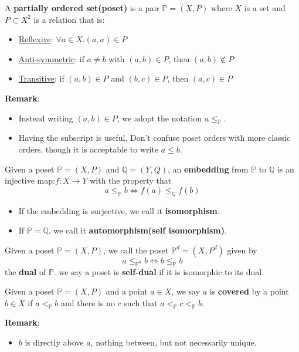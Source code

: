 \begin{definition}
    A \textbf{partially ordered set(poset)} is a pair $\mathbb{P}=(X,P)$ where $X$ is a set and $P \subset X^2$ is a relation that is:
    \begin{itemize}
        \item \underline{Reflexive}: $\forall a \in X. (a,a)\in P$
        \item \underline{Anti-symmetric}: if $a \neq b$ with $(a,b)\in P$, then $(a,b)\notin P$
        \item \underline{Transitive}: if $(a,b)\in P$ and $(b,c)\in P$, then $(a,c) \in P$
    \end{itemize}
\end{definition}
\textbf{Remark}:
\begin{itemize}
    \item Instead writing $(a,b)\in P$, we adopt the notation $a \leq_{\mathbb{P}}$.
    \item Having the subscript is useful. Don't confuse poset orders with more classic orders, though it is acceptable to write $a \leq b$.
\end{itemize}

\begin{definition}
    Given a poset $\mathbb{P}=(X,P)$ and $\mathbb{Q}=(Y,Q)$, an \textbf{embedding} from $\mathbb{P}$ to $\mathbb{Q}$ is an injective map:$f:X \longrightarrow Y$ with the property that $$a \leq_{\mathbb{P}} b \Longleftrightarrow f(a) \leq_{\mathbb{Q}} f(b)$$
    \begin{itemize}
        \item If the embedding is surjective, we call it \textbf{isomorphism}.
        \item If $\mathbb{P}=\mathbb{Q}$, we call it \textbf{automorphism(self isomorphism)}.
    \end{itemize}
\end{definition}

\begin{definition}
    Given a poset $\mathbb{P}=(X,P)$, we call the poset $\mathbb{P}^d=(X,P^d)$ given by $$a \leq_{\mathbb{P}^d} b \Longleftrightarrow b \leq_{\mathbb{P}} b$$
    the \textbf{dual} of $\mathbb{P}$. we say a poset is \textbf{self-dual} if it is isomorphic to its dual.
\end{definition}

\begin{definition}
    Given a poset $\mathbb{P}=(X,P)$ and a point $a \in X$, we say $a$ is \textbf{covered} by a point $b \in X$ if $a <_{\mathbb{P}} b$ and there is no $c$ such that $a <_{\mathbb{P}} c <_{\mathbb{P}} b$.
\end{definition}
\textbf{Remark}:
\begin{itemize}
    \item $b$ is directly above $a$, nothing between, but not necessarily unique.
\end{itemize}

